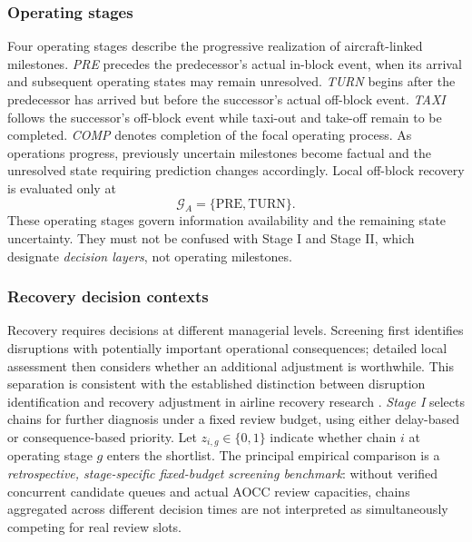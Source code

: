 \subsubsection{Operating stages}

Four operating stages describe the progressive realization of aircraft-linked milestones. \emph{PRE} precedes the predecessor's actual in-block event, when its arrival and subsequent operating states may remain unresolved. \emph{TURN} begins after the predecessor has arrived but before the successor's actual off-block event. \emph{TAXI} follows the successor's off-block event while taxi-out and take-off remain to be completed. \emph{COMP} denotes completion of the focal operating process. As operations progress, previously uncertain milestones become factual and the unresolved state requiring prediction changes accordingly. Local off-block recovery is evaluated only at
\[
\mathcal G_A=\{\mathrm{PRE},\mathrm{TURN}\}.
\]
These operating stages govern information availability and the remaining state uncertainty. They must not be confused with Stage I and Stage II, which designate \emph{decision layers}, not operating milestones.

\subsubsection{Recovery decision contexts}

Recovery requires decisions at different managerial levels. Screening first identifies disruptions with potentially important operational consequences; detailed local assessment then considers whether an additional adjustment is worthwhile. This separation is consistent with the established distinction between disruption identification and recovery adjustment in airline recovery research \citep{peiDecisionSupportIrregular2021,zhaoTwoStageAircraftRecovery2023}. \emph{Stage I} selects chains for further diagnosis under a fixed review budget, using either delay-based or consequence-based priority. Let $z_{i,g}\in\{0,1\}$ indicate whether chain $i$ at operating stage $g$ enters the shortlist. The principal empirical comparison is a \emph{retrospective, stage-specific fixed-budget screening benchmark}: without verified concurrent candidate queues and actual AOCC review capacities, chains aggregated across different decision times are not interpreted as simultaneously competing for real review slots.

